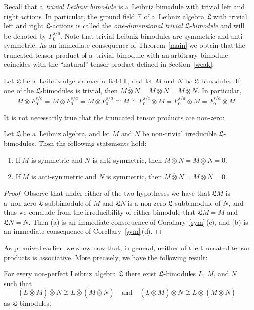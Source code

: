 \documentclass{jonasart}
\newcommand{\fbb}{\mathbb{F}}
\newcommand{\lf}{\mathfrak{L}}
\newcommand{\ovo}{\overline{\otimes}}
\newcommand{\und}{\underline{\otimes}}
\begin{document}
	Recall that a~\emph{trivial Leibniz bimodule\/} is a~Leibniz bimodule with trivial left and right actions. In particular, the ground field
	$\fbb$ of a~Leibniz algebra $\lf$ with trivial left and right $\lf$-actions is called the \emph{one-dimensional trivial $\lf$-bimodule\/} and will be denoted by $F_0^{s/a}$. Note that trivial Leibniz bimodules are symmetric and anti-symmetric. As an immediate consequence of
	Theorem~\ref{main} we obtain that the truncated tensor product of a~trivial bimodule with an arbitrary bimodule coincides with the
	``natural'' tensor product defined in Section~\ref{weak}:
	\begin{corollary}\label{triv}
		Let $\lf$ be a~Leibniz algebra over a~field $\fbb$, and let $M$ and
		$N$ be $\lf$-bimodules. If one of the $\lf$-bimodules is trivial, then $M\ovo N=M\und N=M\otimes N$. In particular,
        \[
            M\ovo
    		F_0^{s/a}=M\und F_0^{s/a}=M\otimes F_0^{s/a}\cong M\cong
    		F_0^{s/a}\otimes M=F_0^{s/a}\ovo M=F_0^{s/a}\und M.
        \]
	\end{corollary}
	It is not necessarily true that the truncated tensor products are non-zero:
	\begin{corollary}\label{irred}
		Let $\lf$ be a~Leibniz algebra, and let $M$ and $N$ be non-trivial irreducible $\lf$-bimodules. Then the following statements hold:
		\begin{enumerate}
			\item[\textrm{(a)}] If $M$ is symmetric and $N$ is anti-symmetric, then $M\ovo N=M\und N=0$.
			\item[\textrm{(b)}] If $M$ is anti-symmetric and $N$ is symmetric, then $M\ovo N=M\und N=0$.
		\end{enumerate}
	\end{corollary}

	\begin{proof}
		Observe that under either of the two hypotheses we have that
		$\lf M$ is a~non-zero $\lf$-subbimodule of $M$ and $\lf N$ is a non-zero $\lf$-subbimodule of $N$, and thus we conclude from the irreducibility of either bimodule that $\lf M=M$ and $\lf N=
		N$. Then (a) is an immediate consequence of Corollary~\ref{sym}\,(c), and (b) is an immediate consequence of Corollary~\ref{sym}\,(d).
	\end{proof}

	As promised earlier, we show now that, in general, neither of the truncated tensor products is associative. More precisely, we have the following result:
	\begin{proposition}\label{nonasso}
		For every non-perfect Leibniz algebra $\lf$ there exist
		$\lf$-bimodules $L$, $M$, and $N$ such that
		\[
			(L\ovo M)\ovo N\not\cong L\ovo(M\ovo N)
		      \quad \text{and} \quad
			(L\und M)\und N\not\cong L\und(M\und N)
		\]
		as $\lf$-bimodules.
	\end{proposition}
\end{document}
